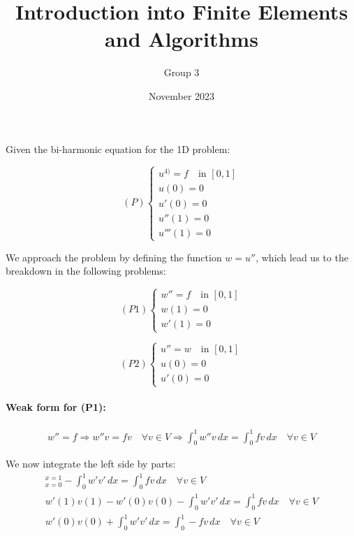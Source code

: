 \documentclass{article}
\title{Introduction into Finite Elements and Algorithms}
\author{Group 3}
\date{November 2023}
\begin{document}
\maketitle

\noindent Given the bi-harmonic equation for the 1D problem:

\[ (P) \left\{
\begin{array}{rcl}
u^{4)}=f \quad \text{in } [0,1]\\
u(0)=0\\
u'(0)=0\\
u''(1)=0\\
u'''(1)=0
\end{array}
\right.\]

\noindent We approach the problem by defining the function $w=u''$, which lead us to the breakdown in the following problems:

\[ (P1) \left\{
\begin{array}{rcl}
w''=f \quad \text{in } [0,1]\\
w(1)=0\\
w'(1)=0
\end{array}
\right.\]

\[ (P2) \left\{
\begin{array}{rcl}
u''=w \quad \text{in } [0,1]\\
u(0)=0\\
u'(0)=0
\end{array}
\right.\]

\paragraph{Weak form for (P1):}
\begin{gather*}
    w''=f \Rightarrow w''v=fv \quad \forall v\in V \Rightarrow \int_0^1 w''v \,dx=\int_0^1 fv \,dx\quad \forall v\in V
\end{gather*}

\noindent We now integrate the left side by parts:
\begin{gather*}
    [w'v]_{x=0}^{x=1}-\int_0^1 w'v'\, dx= \int_0^1 fv \,dx\quad \forall v\in V\\
    w'(1)v(1)-w'(0)v(0)-\int_0^1 w'v'\, dx= \int_0^1 fv \,dx\quad \forall v\in V\\
    w'(0)v(0)+\int_0^1 w'v'\, dx= \int_0^1 -fv \,dx\quad \forall v\in V\\
\end{gather*}
\end{document}
